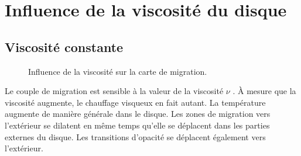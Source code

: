 \section{Influence de la viscosité du disque}
\subsection{Viscosité constante}

\begin{figure}[htbp]
\centering
{}
\hfill
{}


\hfill
{}
\caption{Influence de la viscosité sur la carte de migration. }\label{fig:constant_viscosity}
\end{figure}

Le couple de migration est sensible à la valeur de la viscosité $\nu$ . À mesure que la
viscosité augmente, le chauffage visqueux en fait autant. La température augmente de manière générale dans le disque. Les
zones de migration vers l'extérieur se dilatent en même temps qu'elle se déplacent dans les parties externes du disque. Les
transitions d'opacité se déplacent également vers l'extérieur. 

